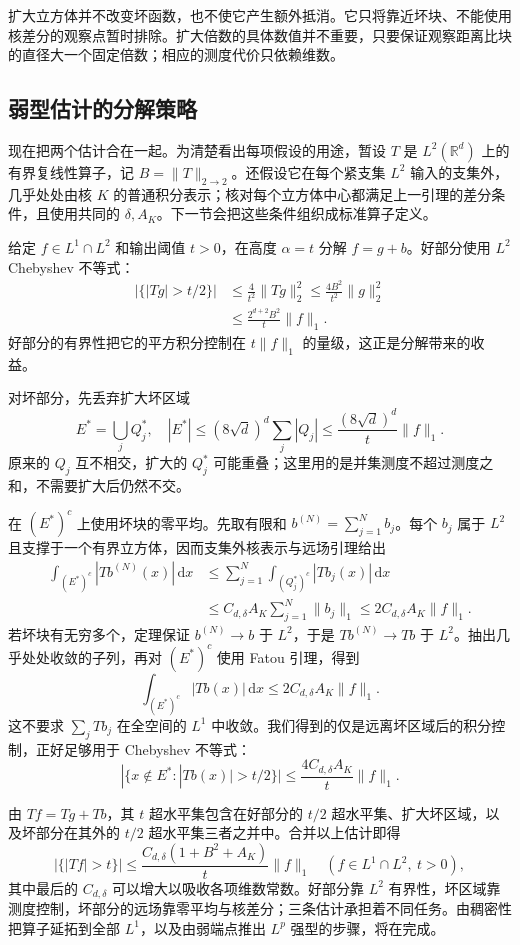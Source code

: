 \ProseParagraphBreak

扩大立方体并不改变坏函数，也不使它产生额外抵消。它只将靠近坏块、不能使用核差分的观察点暂时排除。扩大倍数的具体数值并不重要，只要保证观察距离比块的直径大一个固定倍数；相应的测度代价只依赖维数。

\subsection{弱型估计的分解策略}
\label{b2:subsec:180203}

现在把两个估计合在一起。为清楚看出每项假设的用途，暂设 \(T\) 是 \(L^2(\mathbb R^d)\) 上的有界复线性算子，记 \(B=\|T\|_{2\to2}\)。还假设它在每个紧支集 \(L^2\) 输入的支集外，几乎处处由核 \(K\) 的普通积分表示；核对每个立方体中心都满足上一引理的差分条件，且使用共同的 \(\delta,A_K\)。下一节会把这些条件组织成标准算子定义。

\ProseParagraphBreak

给定 \(f\in L^1\cap L^2\) 和输出阈值 \(t>0\)，在高度 \(\alpha=t\) 分解 \(f=g+b\)。好部分使用 \(L^2\) Chebyshev 不等式：
\[
 \begin{aligned}
 |\{|Tg|>t/2\}|
 &\leq\frac4{t^2}\|Tg\|_2^2
 \leq\frac{4B^2}{t^2}\|g\|_2^2\\
 &\leq\frac{2^{d+2}B^2}{t}\|f\|_1.
 \end{aligned}
\]
好部分的有界性把它的平方积分控制在 \(t\|f\|_1\) 的量级，这正是分解带来的收益。

\ProseParagraphBreak

对坏部分，先丢弃扩大坏区域
\[
 E^*=\bigcup_jQ_j^*,
 \quad |E^*|\leq(8\sqrt d)^d\sum_j|Q_j|
          \leq\frac{(8\sqrt d)^d}{t}\|f\|_1.
\]
原来的 \(Q_j\) 互不相交，扩大的 \(Q_j^*\) 可能重叠；这里用的是并集测度不超过测度之和，不需要扩大后仍然不交。

\ProseParagraphBreak

在 \((E^*)^c\) 上使用坏块的零平均。先取有限和 \(b^{(N)}=\sum_{j=1}^Nb_j\)。每个 \(b_j\) 属于 \(L^2\) 且支撑于一个有界立方体，因而支集外核表示与远场引理给出
\[
 \begin{aligned}
 \int_{(E^*)^c}|Tb^{(N)}(x)|\,\mathrm dx
 &\leq\sum_{j=1}^N\int_{(Q_j^*)^c}|Tb_j(x)|\,\mathrm dx\\
 &\leq C_{d,\delta}A_K\sum_{j=1}^N\|b_j\|_1
 \leq2C_{d,\delta}A_K\|f\|_1.
 \end{aligned}
\]
若坏块有无穷多个，定理保证 \(b^{(N)}\to b\) 于 \(L^2\)，于是 \(Tb^{(N)}\to Tb\) 于 \(L^2\)。抽出几乎处处收敛的子列，再对 \((E^*)^c\) 使用 Fatou 引理，得到
\[
 \int_{(E^*)^c}|Tb(x)|\,\mathrm dx
 \leq2C_{d,\delta}A_K\|f\|_1.
\]
这不要求 \(\sum_jTb_j\) 在全空间的 \(L^1\) 中收敛。我们得到的仅是远离坏区域后的积分控制，正好足够用于 Chebyshev 不等式：
\[
 |\{x\notin E^*:|Tb(x)|>t/2\}|
 \leq\frac{4C_{d,\delta}A_K}{t}\|f\|_1.
\]

由 \(Tf=Tg+Tb\)，其 \(t\) 超水平集包含在好部分的 \(t/2\) 超水平集、扩大坏区域，以及坏部分在其外的 \(t/2\) 超水平集三者之并中。合并以上估计即得
\[
 |\{|Tf|>t\}|
 \leq\frac{C_{d,\delta}(1+B^2+A_K)}t\|f\|_1
 \quad(f\in L^1\cap L^2,\ t>0),
\]
其中最后的 \(C_{d,\delta}\) 可以增大以吸收各项维数常数。好部分靠 \(L^2\) 有界性，坏区域靠测度控制，坏部分的远场靠零平均与核差分；三条估计承担着不同任务。由稠密性把算子延拓到全部 \(L^1\)，以及由弱端点推出 \(L^p\) 强型的步骤，将在完成。
